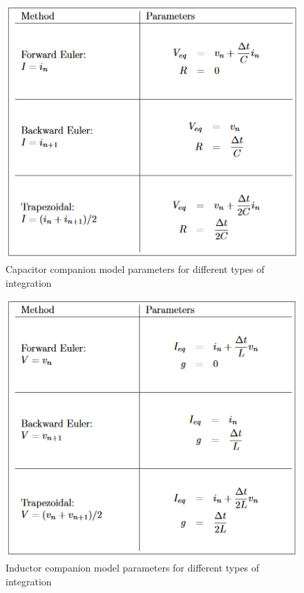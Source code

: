 \documentclass[12pt,a4paper]{article}
\begin{document}
	\begin{figure} 
		\centering
		\includegraphics[scale=0.90]{capacitor.PNG}
		\caption{\centering Capacitor companion model parameters for different types of integration 
		\cite{companion}}
	\end{figure} 
	\begin{figure} 
		\centering
		\includegraphics[scale=0.90]{inductor.PNG}
		\caption{\centering Inductor companion model parameters for different types of integration 
		\cite{companion}}
	\end{figure}
	\pagebreak
\end{document}
